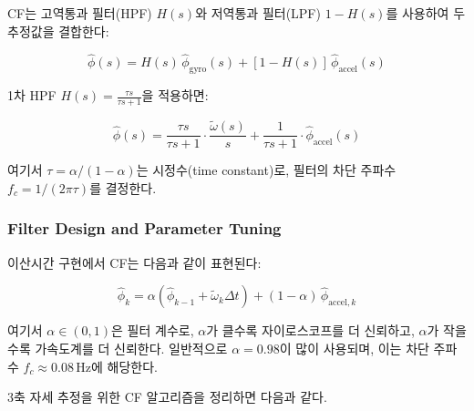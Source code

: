 CF는 고역통과 필터(HPF) $H(s)$와 저역통과 필터(LPF) $1 - H(s)$를 사용하여
두 추정값을 결합한다:

\begin{equation}
    \hat{\phi}(s) = H(s)\,\hat{\phi}_{\text{gyro}}(s) + [1 - H(s)]\,\hat{\phi}_{\text{accel}}(s)
    \label{eq:cf_combine}
\end{equation}

1차 HPF $H(s) = \frac{\tau s}{\tau s + 1}$을 적용하면:

\begin{equation}
    \hat{\phi}(s) = \frac{\tau s}{\tau s + 1}\cdot\frac{\tilde{\omega}(s)}{s} + \frac{1}{\tau s + 1}\cdot\hat{\phi}_{\text{accel}}(s)
    \label{eq:cf_1st_order}
\end{equation}

\noindent 여기서 $\tau = \alpha / (1 - \alpha)$는 시정수(time constant)로,
필터의 차단 주파수 $f_c = 1/(2\pi\tau)$를 결정한다.

\subsubsection{Filter Design and Parameter Tuning}

이산시간 구현에서 CF는 다음과 같이 표현된다:

\begin{equation}
    \hat{\phi}_k = \alpha\left(\hat{\phi}_{k-1} + \tilde{\omega}_k \Delta t\right) + (1 - \alpha)\,\hat{\phi}_{\text{accel},k}
    \label{eq:cf_discrete}
\end{equation}

\noindent 여기서 $\alpha \in (0, 1)$은 필터 계수로,
$\alpha$가 클수록 자이로스코프를 더 신뢰하고,
$\alpha$가 작을수록 가속도계를 더 신뢰한다.
일반적으로 $\alpha = 0.98$이 많이 사용되며,
이는 차단 주파수 $f_c \approx 0.08\,\text{Hz}$에 해당한다.

3축 자세 추정을 위한 CF 알고리즘을 정리하면 다음과 같다.

